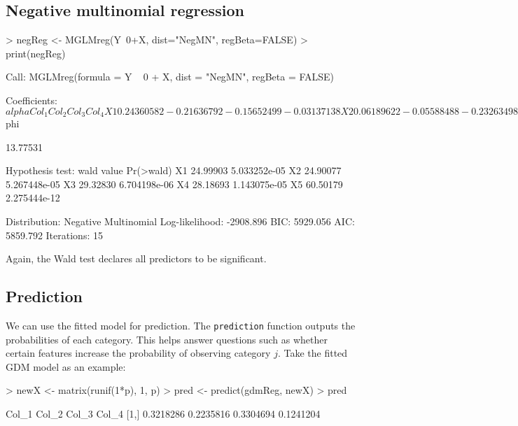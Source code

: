 \documentclass[a4paper]{article}
\begin{document}
\subsection{Negative multinomial regression}

\begin{Schunk}
\begin{Sinput}
> negReg <- MGLMreg(Y~0+X, dist="NegMN", regBeta=FALSE)
> print(negReg)
\end{Sinput}
\begin{Soutput}
Call: MGLMreg(formula = Y ~ 0 + X, dist = "NegMN", regBeta = FALSE)

Coefficients:
$alpha
         Col_1       Col_2       Col_3       Col_4
X1  0.24360582 -0.21636792 -0.15652499 -0.03137138
X2  0.06189622 -0.05588488 -0.23263498 -0.47977959
X3 -0.16091394  0.02268791 -0.27123839 -0.49512726
X4 -0.17618094 -0.04382845  0.03478118 -0.53012642
X5 -0.60797439 -0.11582939  0.01293699 -0.31585689

$phi
         
13.77531 


Hypothesis test: 
   wald value    Pr(>wald)
X1   24.99903 5.033252e-05
X2   24.90077 5.267448e-05
X3   29.32830 6.704198e-06
X4   28.18693 1.143075e-05
X5   60.50179 2.275444e-12

Distribution: Negative Multinomial
Log-likelihood: -2908.896
BIC: 5929.056
AIC: 5859.792
Iterations: 15
\end{Soutput}
\end{Schunk}
Again, the Wald test declares all predictors to be significant. 


\subsection{Prediction}

We can use the fitted model for prediction. The {\tt prediction} function outputs the probabilities of each category.  This helps answer questions such as whether certain features increase the probability of observing category $j$. Take the fitted GDM model as an example:
\begin{Schunk}
\begin{Sinput}
> newX <- matrix(runif(1*p), 1, p)
> pred <- predict(gdmReg, newX)
> pred
\end{Sinput}
\begin{Soutput}
         Col_1     Col_2     Col_3     Col_4
[1,] 0.3218286 0.2235816 0.3304694 0.1241204
\end{Soutput}
\end{Schunk}
\end{document}
